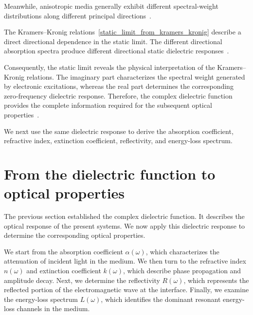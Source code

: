 Meanwhile, anisotropic media generally exhibit different spectral-weight distributions along different principal directions~\cite{suk2024ultrafast,sun2025recent}.

The Kramers--Kronig relations~\eqref{static_limit_from_kramers_kronig} describe a direct directional dependence in the static limit.
The different directional absorption spectra produce different directional static dielectric responses~\cite{suk2024ultrafast}.

Consequently, the static limit reveals the physical interpretation of the Kramers--Kronig relations.
The imaginary part characterizes the spectral weight generated by electronic excitations, 
whereas the real part determines the corresponding zero-frequency dielectric response.
Therefore, the complex dielectric function provides the complete information required for the subsequent optical properties~\cite{lucarini2005kramers,vandenberghe2023two}.

We next use the same dielectric response to derive the absorption coefficient, refractive index, extinction coefficient, reflectivity, and energy-loss spectrum.

\newpage
\FloatBarrier
\section{From the dielectric function to optical properties}
\label{sec:from_dielectric_function_to_optical_properties}

The previous section established the complex dielectric function.
It describes the optical response of the present systems.
We now apply this dielectric response to determine the
corresponding optical properties.

We start from the absorption coefficient $\alpha(\omega)$,
which characterizes the attenuation of incident light in the
medium.
We then turn to the refractive index $n(\omega)$ and extinction
coefficient $k(\omega)$, which describe phase propagation and
amplitude decay.
Next, we determine the reflectivity $R(\omega)$, which
represents the reflected portion of the electromagnetic wave at
the interface.
Finally, we examine the energy-loss spectrum $L(\omega)$,
which identifies the dominant resonant energy-loss channels in the medium.

